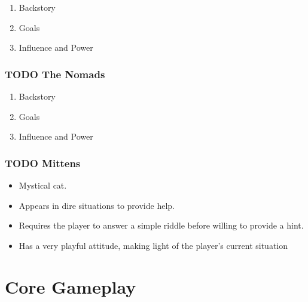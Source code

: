\documentclass[11pt]{article}
\begin{document}
\begin{enumerate}
\item Backstory
\label{sec:org41e2597}

\item Goals
\label{sec:org306e92b}

\item Influence and Power
\label{sec:orga63481c}
\end{enumerate}

\subsubsection{{\bfseries\sffamily TODO} The Nomads}
\label{sec:orgbab6b18}

\begin{enumerate}
\item Backstory
\label{sec:org0ee2b0d}

\item Goals
\label{sec:org5eb7ed1}

\item Influence and Power
\label{sec:org0295410}
\end{enumerate}

\subsubsection{{\bfseries\sffamily TODO} Mittens}
\label{sec:orgf3a51a5}
\begin{itemize}
\item Mystical cat.
\item Appears in dire situations to provide help.
\item Requires the player to answer a simple riddle before willing to provide a hint.
\item Has a very playful attitude, making light of the player's current situation
\end{itemize}

\section{Core Gameplay}
\label{sec:orge5f5163}
\end{document}
